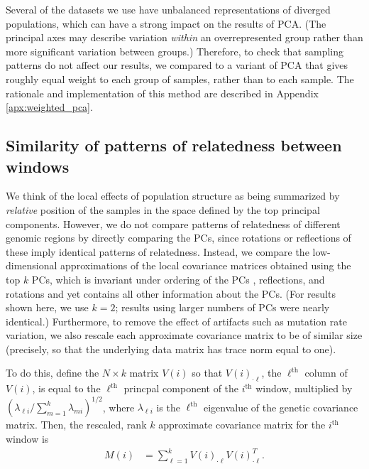 \documentclass[11pt, oneside]{article}   	%
\begin{document}
Several of the datasets we use have unbalanced representations of diverged populations,
which can have a strong impact on the results of PCA.
(The principal axes may describe variation \emph{within} an overrepresented group
rather than more significant variation between groups.)
Therefore, to check that sampling patterns do not affect our results,
we compared to a variant of PCA that gives roughly equal weight to each group of samples,
rather than to each sample.
The rationale and implementation of this method are described in Appendix \ref{apx:weighted_pca}.


\subsection{Similarity of patterns of relatedness between windows}

We think of the local effects of population structure as being summarized by \emph{relative} position of the samples
in the space defined by the top principal components.
However, 
we do not compare patterns of relatedness of different genomic regions by directly comparing the PCs,
since rotations or reflections of these imply identical patterns of relatedness.
Instead, we compare the low-dimensional approximations of the local covariance matrices
obtained using the top $k$ PCs,
which is invariant under ordering of the PCs ,
reflections, and rotations and yet contains all other information about the PCs.
(For results shown here, we use $k=2$;
results using larger numbers of PCs were nearly identical.)
Furthermore, to remove the effect of artifacts such as mutation rate variation,
we also rescale each approximate covariance matrix to be of similar size
(precisely, so that the underlying data matrix has trace norm equal to one).

To do this, define the $N \times k$ matrix $V(i)$ so that $V(i)_{\cdot \ell}$, 
the $\ell^\text{th}$ column of $V(i)$,
is equal to the $\ell^\text{th}$ princpal component of the $i^\text{th}$ window,
multiplied by $( \lambda_{\ell i} / \sum_{m=1}^k \lambda_{m i} )^{1/2}$,
where $\lambda_{\ell i}$ is the $\ell^\text{th}$ eigenvalue of the genetic covariance matrix.
Then, the rescaled, rank $k$ approximate covariance matrix for the $i^\text{th}$ window is
\begin{align} \label{eqn:est_cov}
    M(i) &= \sum_{\ell=1}^k V(i)_{\cdot \ell} V(i)_{\cdot \ell}^T .
\end{align}
\end{document}
